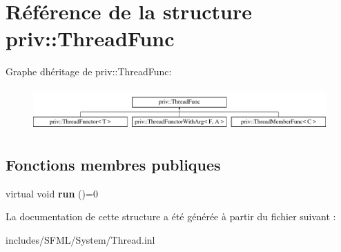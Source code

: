 \hypertarget{structpriv_1_1ThreadFunc}{}\section{Référence de la structure priv\+:\+:Thread\+Func}
\label{structpriv_1_1ThreadFunc}
Graphe d\textquotesingle{}héritage de priv\+:\+:Thread\+Func\+:\begin{figure}[H]
\begin{center}
\leavevmode
\includegraphics[height=1.644640cm]{structpriv_1_1ThreadFunc}
\end{center}
\end{figure}
\subsection*{Fonctions membres publiques}
\begin{DoxyCompactItemize}
\item 
\mbox{\label{structpriv_1_1ThreadFunc_ab5465e714ca4aa92a09bf5e24410a5c3}} 
virtual void {\bfseries run} ()=0
\end{DoxyCompactItemize}


La documentation de cette structure a été générée à partir du fichier suivant \+:\begin{DoxyCompactItemize}
\item 
includes/\+S\+F\+M\+L/\+System/Thread.\+inl\end{DoxyCompactItemize}
